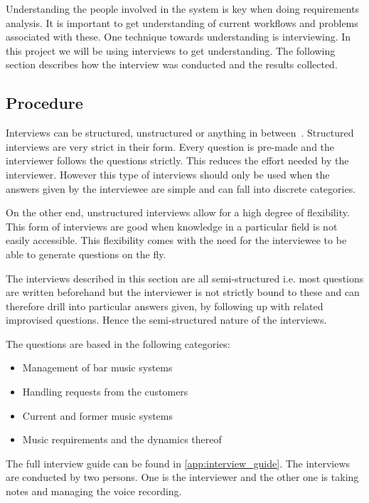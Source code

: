 \label{interviews}

Understanding the people involved in the system is key when doing requirements analysis. It is important to get understanding of current workflows and problems associated with these. One technique towards understanding is interviewing. In this project we will be using interviews to get understanding. The following section describes how the interview was conducted and the results collected.

\subsection{Procedure}
\label{sub:procedure}

Interviews can be structured, unstructured or anything in between~\cite{benyon2013designing}. Structured interviews are very strict in their form. Every question is pre-made and the interviewer follows the questions strictly. This reduces the effort needed by the interviewer. However this type of interviews should only be used when the answers given by the interviewee are simple and can fall into discrete categories.

On the other end, unstructured interviews allow for a high degree of flexibility. This form of interviews are good when knowledge in a particular field is not easily accessible. This flexibility comes with the need for the interviewee to be able to generate questions on the fly.

The interviews described in this section are all semi-structured i.e. most questions are written beforehand but the interviewer is not strictly bound to these and can therefore drill into particular answers given, by following up with related improvised questions. Hence the semi-structured nature of the interviews.

The questions are based in the following categories:

\begin{itemize}
  \item Management of bar music systems
  \item Handling requests from the customers
  \item Current and former music systems
  \item Music requirements and the dynamics thereof
\end{itemize}

The full interview guide can be found in \cref{app:interview_guide}. The interviews are conducted by two persons. One is the interviewer and the other one is taking notes and managing the voice recording.

